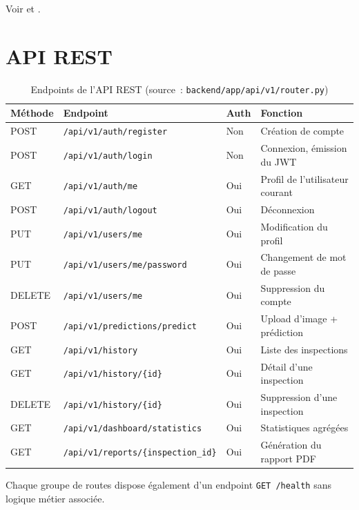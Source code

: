 Voir  et .

\section{API REST}

\begin{table}[H]
\centering
\small
\caption{Endpoints de l'API REST (source~: \texttt{backend/app/api/v1/router.py})}
\label{tab:endpoints}
\begin{tabular}{lll l}
\toprule
M\'ethode & Endpoint & Auth & Fonction \\
\midrule
POST & \texttt{/api/v1/auth/register} & Non & Cr\'eation de compte \\
POST & \texttt{/api/v1/auth/login} & Non & Connexion, \'emission du JWT \\
GET & \texttt{/api/v1/auth/me} & Oui & Profil de l'utilisateur courant \\
POST & \texttt{/api/v1/auth/logout} & Oui & D\'econnexion \\
PUT & \texttt{/api/v1/users/me} & Oui & Modification du profil \\
PUT & \texttt{/api/v1/users/me/password} & Oui & Changement de mot de passe \\
DELETE & \texttt{/api/v1/users/me} & Oui & Suppression du compte \\
POST & \texttt{/api/v1/predictions/predict} & Oui & Upload d'image + pr\'ediction \\
GET & \texttt{/api/v1/history} & Oui & Liste des inspections \\
GET & \texttt{/api/v1/history/\{id\}} & Oui & D\'etail d'une inspection \\
DELETE & \texttt{/api/v1/history/\{id\}} & Oui & Suppression d'une inspection \\
GET & \texttt{/api/v1/dashboard/statistics} & Oui & Statistiques agr\'eg\'ees \\
GET & \texttt{/api/v1/reports/\{inspection\_id\}} & Oui & G\'en\'eration du rapport PDF \\
\bottomrule
\end{tabular}
\end{table}

Chaque groupe de routes dispose \'egalement d'un endpoint \texttt{GET /health} sans logique m\'etier associ\'ee.
